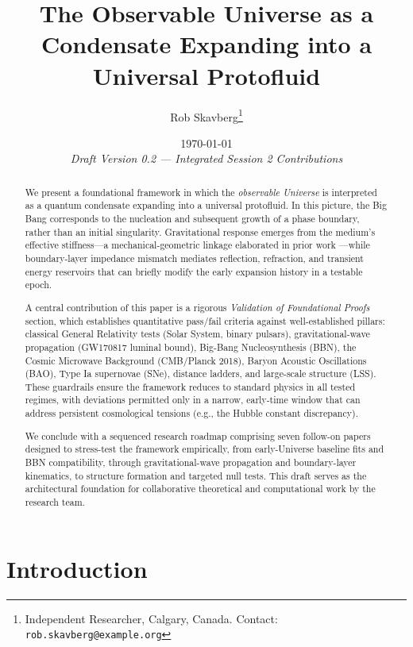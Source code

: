 \documentclass[11pt,a4paper]{article}
\title{\textbf{The Observable Universe as a Condensate Expanding into a Universal Protofluid}}
\author{Rob Skavberg\thanks{Independent Researcher, Calgary, Canada. Contact: \texttt{rob.skavberg@example.org}}}
\date{\today \\ \textit{Draft Version 0.2 --- Integrated Session 2 Contributions}}
\theoremstyle{definition}
\begin{document}
\maketitle
\doublespacing

\begin{abstract}
We present a foundational framework in which the \emph{observable Universe} is interpreted as a quantum condensate expanding into a universal protofluid. In this picture, the Big Bang corresponds to the nucleation and subsequent growth of a phase boundary, rather than an initial singularity. Gravitational response emerges from the medium's effective stiffness---a mechanical-geometric linkage elaborated in prior work \cite{SkavbergMechG2025,SkavbergMechGR2025,SkavbergPlanckField2025}---while boundary-layer impedance mismatch mediates reflection, refraction, and transient energy reservoirs that can briefly modify the early expansion history in a testable epoch.

A central contribution of this paper is a rigorous \emph{Validation of Foundational Proofs} section, which establishes quantitative pass/fail criteria against well-established pillars: classical General Relativity tests (Solar System, binary pulsars), gravitational-wave propagation (GW170817 luminal bound), Big-Bang Nucleosynthesis (BBN), the Cosmic Microwave Background (CMB/Planck 2018), Baryon Acoustic Oscillations (BAO), Type Ia supernovae (SNe), distance ladders, and large-scale structure (LSS). These guardrails ensure the framework reduces to standard physics in all tested regimes, with deviations permitted only in a narrow, early-time window that can address persistent cosmological tensions (e.g., the Hubble constant discrepancy).

We conclude with a sequenced research roadmap comprising seven follow-on papers designed to stress-test the framework empirically, from early-Universe baseline fits and BBN compatibility, through gravitational-wave propagation and boundary-layer kinematics, to structure formation and targeted null tests. This draft serves as the architectural foundation for collaborative theoretical and computational work by the research team.
\end{abstract}

\tableofcontents
\newpage

\section{Introduction}
\label{sec:intro}
\end{document}
